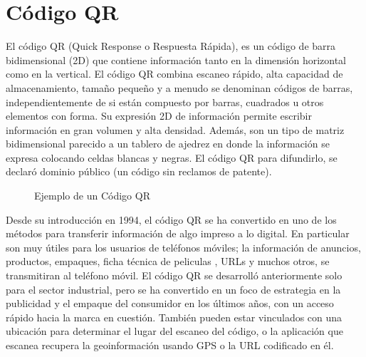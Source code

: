 \section{Código QR}
El código QR (Quick Response o Respuesta Rápida), es un código de barra bidimensional (2D) que contiene información tanto en la dimensión horizontal como en la vertical. El código QR combina escaneo rápido, alta capacidad de almacenamiento, tamaño pequeño y a menudo se denominan códigos de barras, independientemente de si están compuesto por barras, cuadrados u otros elementos con forma. \cite{2012_DENSO}
Su expresión 2D de información permite escribir información en gran volumen y alta densidad. Además, son un tipo de matriz bidimensional parecido a un tablero de ajedrez en donde la información se expresa colocando celdas blancas y negras. El código QR para difundirlo, se declaró dominio público (un código sin reclamos de patente).  \cite{2019_Hara}
\begin{figure}
\centering
\qrcode{} 
\caption{Ejemplo de un Código QR}
\label{fig:qrcodeexample}
\end{figure}

Desde su introducción en 1994, el código QR se ha convertido en uno de los métodos para transferir información de algo impreso a lo digital. En particular son muy útiles para los usuarios de teléfonos móviles; la información de anuncios, productos, empaques, ficha técnica de peliculas , URLs y muchos otros, se transmitiran al teléfono móvil. El código QR se desarrolló anteriormente solo para el sector industrial, pero se ha convertido en un foco de estrategia en la publicidad y el empaque del consumidor en los últimos años, con un acceso rápido hacia la marca en cuestión. También pueden estar vinculados con una ubicación para determinar el lugar del escaneo del código, o la aplicación que escanea recupera la geoinformación usando GPS o la URL codificado en él.\cite{2015_Emran_BOOK,2012_Varallyai}